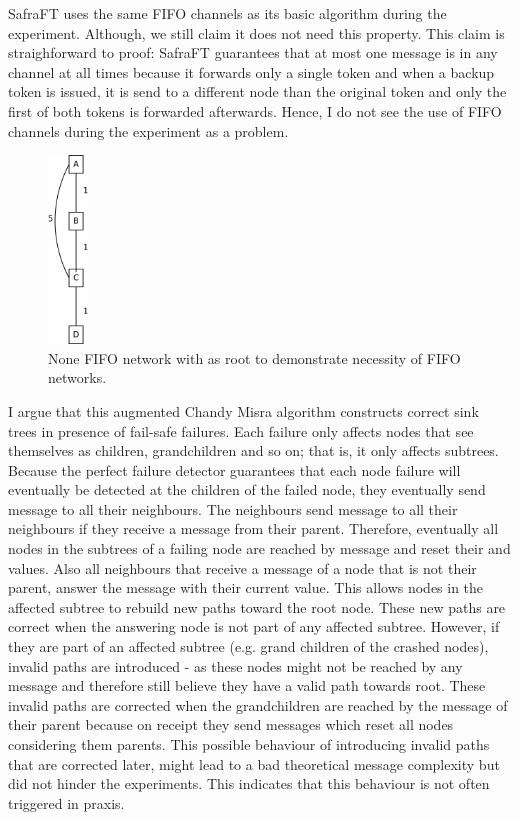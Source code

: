   SafraFT uses the same FIFO channels as its basic algorithm during the experiment.
  Although, we still claim it does not need this property.
  This claim is straighforward to proof: SafraFT guarantees that at most one message is in any channel at all times because it forwards only a single token and when a backup token is issued, it is send to a different node than the original token and only the first of both tokens is forwarded afterwards.
  Hence, I do not see the use of FIFO channels during the experiment as a problem.
  
  \begin{figure}[h]
  	\includegraphics[height=5cm]{figures/FIFO_necessary}
  	\centering
  	\caption{None FIFO network with  as root to demonstrate necessity of FIFO networks.}	
  	\label{fig:fifoNecessaryNetwork}
  \end{figure}
    
  I argue that this augmented Chandy Misra algorithm constructs correct sink trees in presence of fail-safe failures. 
  Each failure only affects nodes that see themselves as children, grandchildren and so on; that is, it only affects subtrees.
  Because the perfect failure detector guarantees that each node failure will eventually be detected at the children of the failed node, they eventually send  message to all their neighbours.
  The neighbours send  message to all their neighbours if they receive a  message from their parent. 
  Therefore, eventually all nodes in the subtrees of a failing node are reached by  message and reset their  and  values.
  Also all neighbours that receive a  message of a node that is not their parent, answer the  message with their current  value.
  This allows nodes in the affected subtree to rebuild new paths toward the root node.
  These new paths are correct when the answering node is not part of any affected subtree.
  However, if they are part of an affected subtree (e.g. grand children of the crashed nodes), invalid paths are introduced - as these nodes might not be reached by any  message and therefore still believe they have a valid path towards root.
  These invalid paths are corrected when the grandchildren are reached by the  message of their parent because on receipt they send  messages which reset all nodes considering them
  parents. 
  This possible behaviour of introducing invalid paths that are corrected later, might lead to a bad theoretical message complexity but did not hinder the experiments.
  This indicates that this behaviour is not often triggered in praxis.
  
